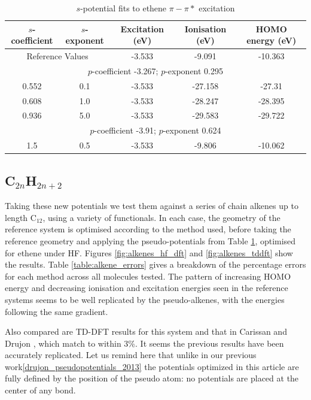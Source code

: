 \documentclass[journal=jctcce,manuscript=article]{achemso}
\begin{document}
\begin{table}[ht]
\caption{\(s\)-potential fits to ethene \(\pi-\pi*\) excitation}
\begin{tabular}{c c c c c}
\hline
\(s\)-coefficient & \(s\)-exponent & Excitation (eV) & Ionisation (eV) & HOMO energy (eV) \\
\hline
\multicolumn{2}{c}{Reference Values} & -3.533 & -9.091 & -10.363 \\
\hline
\multicolumn{5}{c}{\(p\)-coefficient -3.267; \(p\)-exponent 0.295} \\
\hline
0.552 & 0.1 & -3.533 & -27.158 & -27.31 \\
0.608 & 1.0 & -3.533 & -28.247 & -28.395 \\
0.936 & 5.0 & -3.533 & -29.583 & -29.722 \\
\hline
\multicolumn{5}{c}{\(p\)-coefficient -3.91; \(p\)-exponent 0.624} \\
\hline
1.5 & 0.5 & -3.533 & -9.806 & -10.062 \\
\hline
\end{tabular}
\label{table:ethene_excitations}
\end{table}

\subsection{C\(_{2n}\)H\(_{2n+2}\)}

Taking these new potentials we test them against a series of chain alkenes up to length C\(_{12}\), using a variety of functionals. In each case, the geometry of the reference system is optimised according to the method used, before taking the reference geometry and applying the pseudo-potentials from Table \ref{table:ethene_excitations}, optimised for ethene under HF. Figures \ref{fig:alkenes_hf_dft} and \ref{fig:alkenes_tddft} show the results. Table \ref{table:alkene_errors} gives a breakdown of the percentage errors for each method across all molecules tested. The pattern of increasing HOMO energy and decreasing ionisation and excitation energies seen in the reference systems seems to be well replicated by the pseudo-alkenes, with the energies following the same gradient.

Also compared are TD-DFT results for this system and that in Carissan and Drujon \cite{drujon_pseudopotentials_2013}, which match to within 3\%. It seems the previous results have been accurately replicated.
Let us remind here that unlike in our previous work\ref{drujon_pseudopotentials_2013}
the potentials optimized in this article are fully defined by the position
of the pseudo atom: no potentials are placed at the center of any bond.
\end{document}
